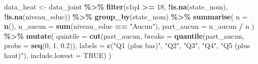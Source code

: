 \documentclass[
]{article}
\newenvironment{Shaded}{\begin{snugshade}}{\end{snugshade}}
\newcommand{\AttributeTok}[1]{\textcolor[rgb]{0.13,0.29,0.53}{#1}}
\newcommand{\ConstantTok}[1]{\textcolor[rgb]{0.56,0.35,0.01}{#1}}
\newcommand{\DecValTok}[1]{\textcolor[rgb]{0.00,0.00,0.81}{#1}}
\newcommand{\FloatTok}[1]{\textcolor[rgb]{0.00,0.00,0.81}{#1}}
\newcommand{\FunctionTok}[1]{\textcolor[rgb]{0.13,0.29,0.53}{\textbf{#1}}}
\newcommand{\NormalTok}[1]{#1}
\newcommand{\OtherTok}[1]{\textcolor[rgb]{0.56,0.35,0.01}{#1}}
\newcommand{\SpecialCharTok}[1]{\textcolor[rgb]{0.81,0.36,0.00}{\textbf{#1}}}
\newcommand{\StringTok}[1]{\textcolor[rgb]{0.31,0.60,0.02}{#1}}
\begin{document}
\begin{Shaded}
\begin{Highlighting}[]
\NormalTok{data\_heat }\OtherTok{\textless{}{-}}\NormalTok{ data\_joint }\SpecialCharTok{\%\textgreater{}\%}
  \FunctionTok{filter}\NormalTok{(s1q4 }\SpecialCharTok{\textgreater{}=} \DecValTok{18}\NormalTok{, }\SpecialCharTok{!}\FunctionTok{is.na}\NormalTok{(state\_nom), }\SpecialCharTok{!}\FunctionTok{is.na}\NormalTok{(niveau\_educ)) }\SpecialCharTok{\%\textgreater{}\%}
  \FunctionTok{group\_by}\NormalTok{(state\_nom) }\SpecialCharTok{\%\textgreater{}\%}
  \FunctionTok{summarise}\NormalTok{(}
    \AttributeTok{n          =} \FunctionTok{n}\NormalTok{(),}
    \AttributeTok{n\_aucun    =} \FunctionTok{sum}\NormalTok{(niveau\_educ }\SpecialCharTok{==} \StringTok{"Aucun"}\NormalTok{),}
    \AttributeTok{part\_aucun =}\NormalTok{ n\_aucun }\SpecialCharTok{/}\NormalTok{ n}
\NormalTok{  ) }\SpecialCharTok{\%\textgreater{}\%}
  \FunctionTok{mutate}\NormalTok{(}
    \AttributeTok{quintile =} \FunctionTok{cut}\NormalTok{(part\_aucun,}
                   \AttributeTok{breaks =} \FunctionTok{quantile}\NormalTok{(part\_aucun, }\AttributeTok{probs =} \FunctionTok{seq}\NormalTok{(}\DecValTok{0}\NormalTok{, }\DecValTok{1}\NormalTok{, }\FloatTok{0.2}\NormalTok{)),}
                   \AttributeTok{labels =} \FunctionTok{c}\NormalTok{(}\StringTok{"Q1 (plus bas)"}\NormalTok{, }\StringTok{"Q2"}\NormalTok{, }\StringTok{"Q3"}\NormalTok{, }\StringTok{"Q4"}\NormalTok{, }\StringTok{"Q5 (plus haut)"}\NormalTok{),}
                   \AttributeTok{include.lowest =} \ConstantTok{TRUE}\NormalTok{)}
\NormalTok{  )}


\end{Highlighting}
\end{Shaded}
\end{document}
